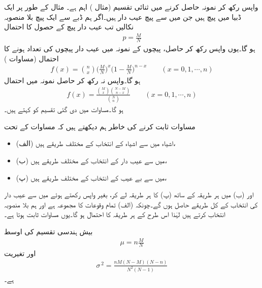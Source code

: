 واپس رکھ کر نمونہ حاصل کرنے میں ثنائی تقسیم (مثال ) اہم ہے۔ مثال کے طور پر ایک ڈبیا میں  پیچ ہیں جن میں سے  پیچ عیب دار ہیں۔اگر ہم ڈبے سے ایک پیچ بلا منصوبہ نکالیں تب عیب دار پیچ کے حصول کا احتمال
\begin{align*}
p=\frac{M}{N}
\end{align*}
ہو گا۔یوں واپس رکھ کر حاصل،  پیچوں کے نمونہ میں عیب دار پیچوں کی تعداد  ہونے کا احتمال (مساوات )
\begin{align}\label{مساوات_شماریات_واپس_رکھ_کر_نمونہ}
f(x)=\binom{n}{x}\big(\frac{M}{N}\big)^x\big(1-\frac{M}{N}\big)^{n-x}\quad\quad (x=0,1,\cdots,n)
\end{align}
ہو گا۔واپس نہ رکھ کر حاصل نمونہ میں احتمال 
\begin{align}\label{مساوات_شماریات_بیش_ہندسی_تقسیم}
f(x)=\frac{\binom{M}{x}\binom{N-M}{n-x}}{\binom{N}{n}}\quad\quad (x=0,1,\cdots,n)
\end{align}
ہو گا۔مساوات  میں دی گئی تقسیم کو  کہتے ہیں۔

مساوات  ثابت کرنے کی خاطر ہم دیکھتے ہیں کہ مساوات  کے تحت 
\begin{itemize}
\item{(الف)}
 اشیاء میں سے  اشیاء کے انتخاب کے  مختلف طریقے ہیں،
\item{(ب)}
 میں سے  عیب دار کے انتخاب کے  مختلف طریقے ہیں،
\item{(پ)}
 میں سے  بے عیب کے انتخاب کے  مختلف طریقے ہیں،
\end{itemize}
اور (ب) میں ہر طریقہ کے ساتھ (پ) کا ہر طریقہ لے  کر، بغیر واپس رکھتے ہوئے  میں سے  عیب دار کی انتخاب کے کل طریقے حاصل ہوں گے۔چونکہ (الف) تمام وقوعات کا مجموعہ ہے اور ہم بلا منصوبہ انتخاب کرتے ہیں لہٰذا اس طرح کے ہر طریقہ کا احتمال  ہو گا۔یوں مساوات  ثابت ہوتا ہے۔

بیش ہندسی تقسیم کی اوسط
\begin{align}
\mu=n\frac{M}{N}
\end{align}
اور تغیریت
\begin{align}
\sigma^{\,2}=\frac{nM(N-M)(N-n)}{N^2(N-1)}
\end{align}
ہے۔

